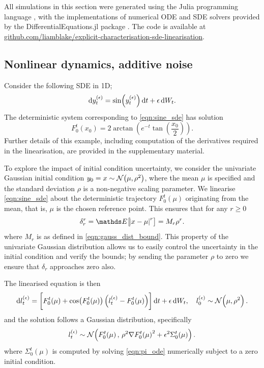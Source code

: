 All simulations in this section were generated using the Julia programming language \citep{BezansonEtAl_2017_JuliaFreshApproach}, with the implementations of numerical ODE and SDE solvers provided by the DifferentialEquations.jl package \citep{RackauckasNie_2017_DifferentialEquationsJlPerformant}.
The code is available at \href{https://github.com/liamblake/explicit-characterisation-sde-linearisation}{github.com/liamblake/explicit-characterisation-sde-linearisation}.




\subsection{Nonlinear dynamics, additive noise}\label{sec:numerics_nonlinear}
Consider the following SDE in 1D;
\begin{equation}\label{eqn:sine_sde}
	\dif y_t^{(\epsilon)} = \sin\!\left(y_t^{(\epsilon)}\right)\dif t + \epsilon \dif W_t.
\end{equation}
The deterministic system corresponding to \cref{eqn:sine_sde} has solution
\[
	F_0^t\!\left(x_0\right) = 2\arctan\left(e^{-t}\tan\left(\frac{x_0}{2}\right)\right).
\]
Further details of this example, including computation of the derivatives required in the linearisation, are provided in the supplementary material.

To explore the impact of initial condition uncertainty, we consider the univariate Gaussian initial condition \(y_0 = x \sim \mathcal{N}\!\left(\mu, \rho^2\right)\), where the mean \(\mu\) is specified and the standard deviation \(\rho\) is a non-negative scaling parameter.
We linearise \cref{eqn:sine_sde} about the deterministic trajectory \(F_0^t\!\left(\mu\right)\) originating from the mean, that is, \(\mu\) is the chosen reference point.
This ensures that for any \(r \geq 0\)
\begin{equation}\label{eqn:num_gauss_init}
	\delta_r^r = \avg{\abs{x - \mu}^r} = M_r \rho^r.
\end{equation}
where \(M_r\) is as defined in \cref{eqn:gauss_dist_bound}.
This property of the univariate Gaussian distribution allows us to easily control the uncertainty in the initial condition and verify the bounds; by sending the parameter \(\rho\) to zero we ensure that \(\delta_r\) approaches zero also.

The linearised equation is then
\begin{equation}
	\dif l_t^{(\epsilon)} = \left[F_0^t\!\left(\mu\right) + \cos\!\left(F_0^t\!\left(\mu\right)\right)\left(l_t^{(\epsilon)} - F_0^t\!\left(\mu\right)\right)\right]\dif t + \epsilon \dif W_t, \quad l_0^{(\epsilon)} \isGauss{\mu, \rho^2}.
	\label{eqn:sine_linear}
\end{equation}
and the solution follows a Gaussian distribution, specifically
\begin{equation}\label{eqn:num_linear_sol}
	l_t^{(\epsilon)} \sim\mathcal{N}\!\left(F_0^t\!\left(\mu\right), \, \rho^2\nabla F_0^t\!\left(\mu\right)^2 + \epsilon^2\Sigma_0^t\!\left(\mu\right)\right).
\end{equation}
where \(\Sigma_0^t\!\left(\mu\right)\) is computed by solving \cref{eqn:pi_ode} numerically subject to a zero initial condition.

